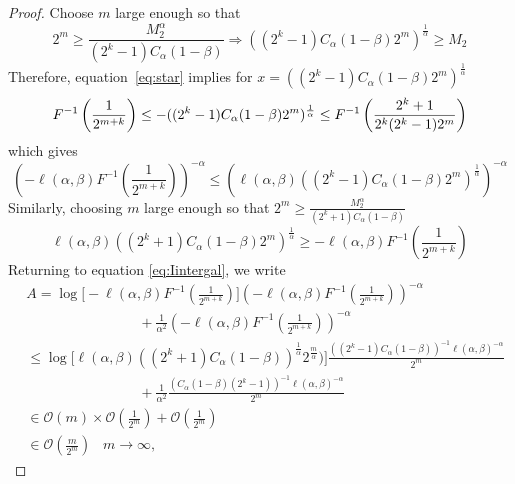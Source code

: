 \documentclass{article}
\theoremstyle{definition}
\begin{document}
\begin{proof}
Choose $m$ large enough so that \begin{equation}
    2^m \geq \frac{M_2^{\alpha}}{(2^{k}-1)C_{\alpha}(1-\beta)}
\Rightarrow ((2^{k}-1)C_{\alpha}(1-\beta)2^m)^{\frac{1}{\alpha}} \geq M_2
\end{equation} 
Therefore, equation~\eqref{eq:star} implies for $x = ((2^{k}-1)C_{\alpha}(1-\beta)2^m)^{\frac{1}{\alpha}}$
\begin{equation}
    F^{-1}\left(\frac{1}{2^{m+k}}\right)  \leq  -((2^{k}-1)C_{\alpha}(1-\beta)2^m)^{\frac{1}{\alpha}}\\ \leq F^{-1}\left( \frac{2^{k}+1}{2^{k}(2^{k}-1)2^m}\right)
\end{equation}
which gives  
\begin{equation}
\left(-\ell(\alpha,\beta)F^{-1}\left(\frac{1}{2^{m+k}}\right)\right)^{-\alpha} \leq \left( \ell(\alpha,\beta)((2^{k}-1)C_{\alpha}(1-\beta)2^m)^{\frac{1}{\alpha}}\right)^{-\alpha} \label{eq:starstar}
\end{equation}
Similarly, choosing $m$ large enough so that \( 2^m \geq \frac{M_2^{\alpha}}{(2^{k}+1)C_{\alpha}(1-\beta)}\)
\begin{equation}
\ell(\alpha,\beta)((2^{k}+1)C_{\alpha}(1-\beta)2^m)^{\frac{1}{\alpha}} \geq  -\ell(\alpha,\beta)F^{-1}\left( \frac{1}{2^{m+k}}\right) 
\label{eq:starstarstar}
\end{equation}
Returning to equation \eqref{eq:Iintergal}, we write
\begin{align}
&A = \log\Bigr[-\ell(\alpha,\beta) F^{-1}\left(\frac{1}{2^{m+k}}\right)\Bigr] \left(-\ell(\alpha,\beta) F^{-1}\left(\frac{1}{2^{m+k}}\right)\right)^{-\alpha}\nonumber\\&\qquad \qquad \qquad \qquad + \frac{1}{\alpha^2}\left(-\ell(\alpha,\beta) F^{-1}\left(\frac{1}{2^{m+k}}\right)\right)^{-\alpha}\nonumber\\
&\leq \log\Big[\ell(\alpha,\beta)((2^{k}+1)C_{\alpha}(1-\beta))^{\frac{1}{\alpha}}2^{\frac{m}{\alpha}})\Bigr]\frac{ ((2^{k}-1)C_{\alpha}(1-\beta))^{-1}\ell(\alpha,\beta)^{-\alpha}}{2^m}\nonumber\\
&\qquad \qquad \qquad \qquad +\frac{1}{\alpha^2}\frac{ (C_{\alpha}(1-\beta)(2^{k}-1))^{-1}\ell(\alpha,\beta)^{-\alpha}}{2^m} \label{eq:usestars}\\
&\in \mathcal{O}\left(m\right) \times \mathcal{O}\left(\frac{1}{2^m}\right)+\mathcal{O}\left(\frac{1}{2^m}\right) \nonumber\\
& \in\mathcal{O}\left(\frac{m}{2^m}\right)\;\;\; m\to\infty \label{eq:comp1},
\end{align}

\end{proof}
\end{document}

